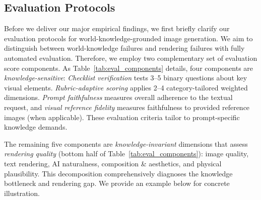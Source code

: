 \documentclass{article}
\begin{document}
\subsection{Evaluation Protocols}
\label{sec:eval_protocols}

Before we deliver our major empirical findings, we first briefly clarify our evaluation protocols for world-knowledge-grounded image generation. We aim to distinguish between world-knowledge failures and rendering failures with fully automated evaluation. Therefore, we employ two complementary set of evaluation score components. As Table~\ref{tab:eval_components} details, four components are \emph{knowledge-sensitive}: \emph{Checklist verification} tests 3--5 binary questions about key visual elements. \emph{Rubric-adaptive scoring} applies 2--4 category-tailored weighted dimensions.  \emph{Prompt faithfulness} measures overall adherence to the textual request, and \emph{visual reference fidelity} measures faithfulness to provided reference images (when applicable). These evaluation criteria tailor to prompt-specific knowledge demands.

The remaining five components are \emph{knowledge-invariant} dimensions that assess \emph{rendering quality} (bottom half of Table~\ref{tab:eval_components}): image quality, text rendering, AI naturalness, composition \& aesthetics, and physical plausibility. This decomposition comprehensively diagnoses the knowledge bottleneck and rendering gap. We provide an example below for concrete illustration. 
\end{document}

